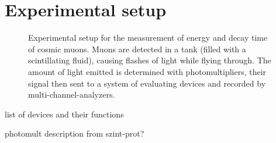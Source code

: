 \section{Experimental setup}

\begin{figure}[H]
        \centering
        \def\svgwidth{1.03\textwidth}
        
        \caption{Experimental setup for the measurement of energy and decay time of cosmic muons.
        Muons are detected in a tank (filled with a scintillating fluid), causing flashes of light while flying through.
        The amount of light emitted is determined with photomultipliers,
        their signal then sent to a system of evaluating
        devices and recorded by multi-channel-analyzers.}
        \label{img:setup}
\end{figure}
 	
 	list of devices and their functions
 	
 	photomult description from szint-prot?